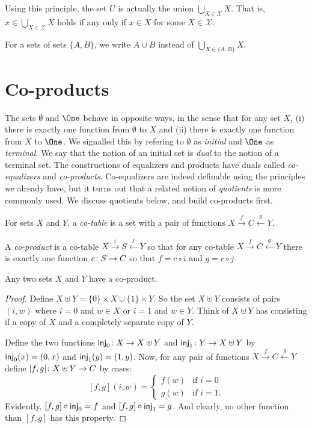 Using this principle, the set $U$ is actually the union $\bigcup_{X\in\mathcal X}X$.
That is, $x\in\bigcup_{X\in\mathcal X}X$ holds if any only if $x\in X$ for some $X\in\mathcal X$.

For a sets of sets $\{A,B\}$, we write $A\cup B$ instead of $\bigcup_{X\in\{A,B\}}X$.

\section{Co-products}

The sets $\emptyset$ and $\One$ behave in opposite ways, in the sense that for any set $X$, (i) there is exactly one function from $\emptyset$ to $X$ and (ii) there is exactly one function from $X$ to $\One$. 
We signalled this by refering to $\emptyset$ as \emph{initial} and $\One$ as \emph{terminal}. 
We say that the notion of an initial set is \emph{dual} to the notion of a terminal set. 
The constructions of equalizers and products have duals called \emph{co-equalizers} and \emph{co-products}. 
Co-equalizers are indeed definable using the principles we already have, but it turns out that a related notion of \emph{quotients} is more commonly used. We discuss quotients below, and build co-products first.

\begin{defn}
	For sets $X$ and $Y$, a \emph{co-table} is a set with a pair of functions
	$X\stackrel{f}{\longrightarrow}C\stackrel{g}{\longleftarrow}Y$.
	
	A \emph{co-product} is a co-table $X\stackrel{i}{\longrightarrow}S\stackrel{j}{\longleftarrow}Y$
	so that for any co-table $X\stackrel{f}{\longrightarrow}C\stackrel{g}{\longleftarrow}Y$
	there is exactly one function ${c}\colon{S}\to{C}$ so that $f = c\circ i$ and
	$g = c\circ j$. 
\end{defn}

\begin{lemma}
	Any two sets $X$ and $Y$ have a co-product.
	
	\begin{proof}
		Define $X\uplus Y = \{0\}\times X \cup \{1\}\times Y$.
		So the set $X\uplus Y$ consists of pairs
		$(i,w)$ where $i=0$ and $w\in X$ or $i=1$ and $w\in Y$.
		Think of $X\uplus Y$ has consisting if a copy of $X$ and a completely separate copy of $Y$.
		
		Define the two functions ${\mathord{\textsf{inj}}_0}\colon{X}\to{X\uplus Y}$ and ${\mathord{\textsf{inj}}_1}\colon{Y}\to{X\uplus Y}$ by $\mathord{\textsf{inj}}_0(x) = (0,x)$ and $\mathord{\textsf{inj}}_1(y) = (1,y)$. 
		Now, for any pair of functions $X\stackrel{f}{\longrightarrow}C\stackrel{g}{\longleftarrow}Y$
		define ${[f,g]}\colon{X\uplus Y}\to{C}$ by cases:
		\[[f,g](i,w) = \begin{cases}
		f(w) &\text{if $i=0$}\\
		g(w) &\text{if $i=1$.}
		\end{cases}\]
		Evidently, $[f,g]\circ \mathord{\textsf{inj}}_0 = f$ and $[f,g]\circ\mathord{\textsf{inj}}_1 = g$. And clearly, no other function than $[f,g]$ has this property.		
	\end{proof}
\end{lemma}

